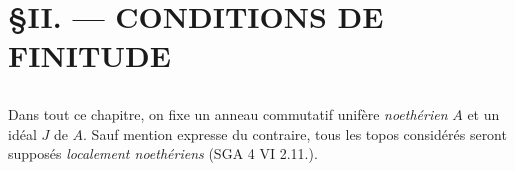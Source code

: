 \chapter*{\S \space II. --- CONDITIONS DE FINITUDE}\thispagestyle{empty}
\label{sec:1}
\section*{}

Dans tout ce chapitre, on fixe un anneau commutatif unifère \emph{noethérien} $A$ et un idéal $J$ de $A$. Sauf mention expresse du contraire, tous les topos considérés seront supposés \emph{localement noethériens} (SGA 4 VI 2.11.).
